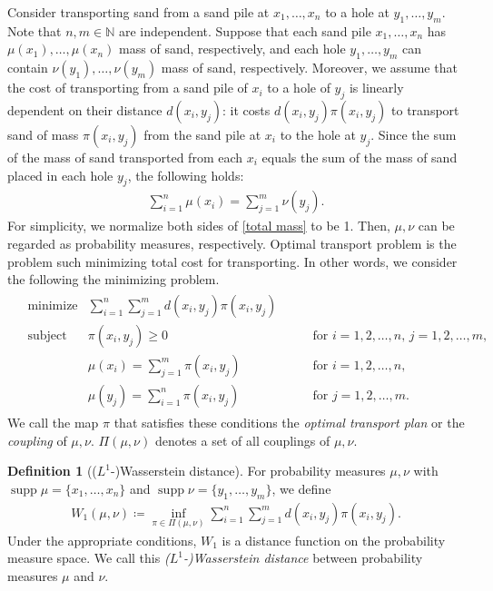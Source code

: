 \documentclass{article}
\numberwithin{equation}{section}
\theoremstyle{definition}
\newtheorem{definition}{Definition}[section]
\newcommand{\dis}{\displaystyle}
\newcommand{\N}{\mathbb{N}}
\DeclareMathOperator\supp{supp} %
\def\:={\coloneqq} %
\begin{document}
Consider transporting sand from a sand pile at $x_1,\ldots,x_n$ to a hole at $y_1,\ldots,y_m$.
Note that $n,m\in\N$ are independent.
Suppose that each sand pile $x_1,\dots,x_n$ has $\mu(x_1),\ldots,\mu(x_n)$ mass of sand, respectively, and each hole $y_1,\dots,y_m$ can contain $\nu(y_1),\dots,\nu(y_m)$ mass of sand, respectively.
Moreover, we assume that the cost of transporting from a sand pile of $x_i$ to a hole of $y_j$ is linearly dependent on their distance $d(x_i,y_j)$: 
it costs $d(x_i,y_j)\pi(x_i,y_j)$ to transport sand of mass $\pi(x_i,y_j)$ from the sand pile at $x_i$ to the hole at $y_j$.
Since the sum of the mass of sand transported from each $x_i$ equals the sum of the mass of sand placed in each hole $y_j$, the following holds:
\begin{align}
    \dis \sum_{i=1}^n \mu(x_i) = \sum_{j=1}^m \nu(y_j). \label{total mass}
\end{align}
For simplicity, we normalize both sides of \eqref{total mass} to be 1.
Then, $\mu,\nu$ can be regarded as probability measures, respectively.
Optimal transport problem is the problem such minimizing total cost for transporting.
In other words, we consider the following the minimizing problem.
\begin{align}
\begin{aligned}
    & \text{minimize} 
        & \sum_{i=1}^n \sum_{j=1}^m d(x_i,y_j)\pi(x_i,y_j) & & \label{object func.2} \\
    & \text{subject to} 
        & \pi(x_i,y_j)\ge 0 & \qquad \text{for } i=1,2,\ldots,n,\, j=1,2,\ldots,m, \\
        & & \mu(x_i)=\sum_{j=1}^m \pi(x_i,y_j) & \qquad \text{for } i=1,2,\ldots,n, \\
        & & \mu(y_j)=\sum_{i=1}^n \pi(x_i,y_j) & \qquad \text{for } j=1,2,\ldots,m. 
\end{aligned}
\end{align}
We call the map $\pi$ that satisfies these conditions the \emph{optimal transport plan} or the \emph{coupling} of $\mu,\nu$.
$\Pi(\mu,\nu)$ denotes a set of all couplings of $\mu,\nu$.
\begin{definition}[($L^1$-)Wasserstein distance]
For probability measures $\mu,\nu$ with $\supp\mu=\{x_1,\ldots,x_n\}$ and $\supp\nu=\{y_1,\ldots,y_m\}$, we define 
\begin{align}
    W_1(\mu,\nu) \:= \inf_{\pi\in\Pi(\mu,\nu)} \sum_{i=1}^n \sum_{j=1}^m d(x_i,y_j)\pi(x_i,y_j). \label{Wasserstein}
\end{align}
Under the appropriate conditions, $W_1$ is a distance function on the probability measure space.
We call this \emph{($L^1$-)Wasserstein distance} between probability measures $\mu$ and $\nu$.
\end{definition}
\end{document}
